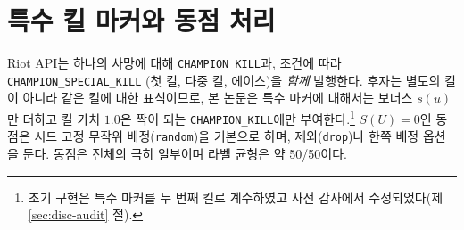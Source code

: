 
\section{특수 킬 마커와 동점 처리}
\label{sec:label-special}

Riot API는 하나의 사망에 대해 \texttt{CHAMPION\_KILL}과, 조건에 따라 \texttt{CHAMPION\_SPECIAL\_KILL} (첫 킬, 다중 킬, 에이스)을 \emph{함께} 발행한다. 후자는 별도의 킬이 아니라 같은 킬에 대한 표식이므로, 본 논문은 특수 마커에 대해서는 보너스 $s(u)$만 더하고 킬 가치 $1.0$은 짝이 되는 \texttt{CHAMPION\_KILL}에만 부여한다.\footnote{초기 구현은 특수 마커를 두 번째 킬로 계수하였고 사전 감사에서 수정되었다(제 \ref{sec:disc-audit} 절).} $S(U) = 0$인 동점은 시드 고정 무작위 배정(\texttt{random})을 기본으로 하며, 제외(\texttt{drop})나 한쪽 배정 옵션을 둔다. 동점은 전체의 극히 일부이며 라벨 균형은 약 50/50이다.
